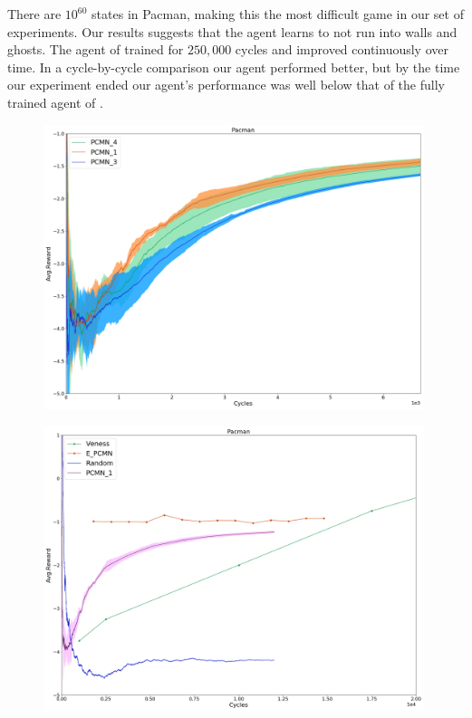 \documentclass{article}
\theoremstyle{definition}
\newtheorem{primary statistics}[definition]{Primary Statistics}
\newtheorem{auxiliary statistics}[definition]{Auxiliary Statistics}
\begin{document}
There are $10^{60}$ states in Pacman, making this the most difficult game in our set of experiments. Our results suggests that the agent learns to not run into walls and ghosts. The agent of \cite{veness2011monte} trained for $250,000$ cycles and improved continuously over time. In a cycle-by-cycle comparison our agent performed better, but by the time our experiment ended our agent's performance was well below that of the fully trained agent of \cite{veness2011monte}. 

 \begin{figure}[!htb]
 \centering
    \includegraphics[width=11.1cm]{4_Pacman}
\end{figure}

 \begin{figure}[!htb]
 \centering
    \includegraphics[width=11.1cm]{Pacman}
\end{figure}



\newpage
\hspace{3cm}
\end{document}
